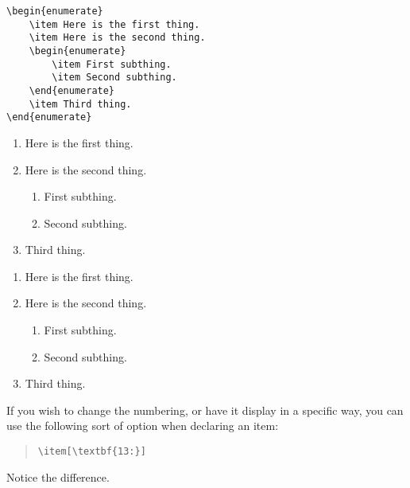 \documentclass[letterpaper,twoside,10pt]{article}
\begin{document}
\begin{multicols}{2}
{\begin{verbatim}
\begin{enumerate}
    \item Here is the first thing.
    \item Here is the second thing.
    \begin{enumerate}
        \item First subthing.
        \item Second subthing.
    \end{enumerate}
    \item Third thing.
\end{enumerate}
\end{verbatim}}

\vspace{8pc}
\begin{enumerate}
	\item Here is the first thing.
	\item Here is the second thing.
	\begin{enumerate}
		\item First subthing.
		\item Second subthing.
	\end{enumerate}
	\item Third thing.
\end{enumerate}
\begin{enumerate}
	\item Here is the first thing.
	\item Here is the second thing.
	\begin{enumerate}
		\item First subthing.
		\item Second subthing.
	\end{enumerate}
	\item Third thing.
\end{enumerate}
\end{multicols}

If you wish to change the numbering, or have it display in a specific way, you can use the following sort of option when declaring an item:

\begin{quote}
 \verb!\item[\textbf{13:}]!
\end{quote}

Notice the difference.
\end{document}
